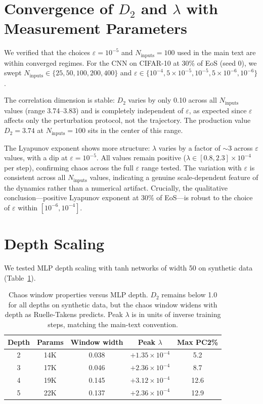 \documentclass[aps,prl,twocolumn,superscriptaddress,floatfix]{revtex4-2}
\begin{document}
\section{Convergence of $D_2$ and $\lambda$ with Measurement Parameters}

We verified that the choices $\varepsilon = 10^{-5}$ and $N_\text{inputs} = 100$ used in the main text are within converged regimes. For the CNN on CIFAR-10 at 30\% of EoS (seed 0), we swept $N_\text{inputs} \in \{25, 50, 100, 200, 400\}$ and $\varepsilon \in \{10^{-4}, 5{\times}10^{-5}, 10^{-5}, 5{\times}10^{-6}, 10^{-6}\}$.

The correlation dimension is stable: $D_2$ varies by only 0.10 across all $N_\text{inputs}$ values (range 3.74--3.83) and is completely independent of $\varepsilon$, as expected since $\varepsilon$ affects only the perturbation protocol, not the trajectory. The production value $D_2 = 3.74$ at $N_\text{inputs} = 100$ sits in the center of this range.

The Lyapunov exponent shows more structure: $\lambda$ varies by a factor of ${\sim}3$ across $\varepsilon$ values, with a dip at $\varepsilon = 10^{-5}$. All values remain positive ($\lambda \in [0.8, 2.3] \times 10^{-4}$ per step), confirming chaos across the full $\varepsilon$ range tested. The variation with $\varepsilon$ is consistent across all $N_\text{inputs}$ values, indicating a genuine scale-dependent feature of the dynamics rather than a numerical artifact. Crucially, the qualitative conclusion---positive Lyapunov exponent at 30\% of EoS---is robust to the choice of $\varepsilon$ within $[10^{-6}, 10^{-4}]$.

\section{Depth Scaling}

We tested MLP depth scaling with tanh networks of width 50 on synthetic data (Table~\ref{tab:depth}).

\begin{table}[h]
\caption{\label{tab:depth}%
Chaos window properties versus MLP depth. $D_2$ remains below 1.0 for all depths on synthetic data, but the chaos window widens with depth as Ruelle-Takens predicts. Peak $\lambda$ is in units of inverse training steps, matching the main-text convention.}
\begin{ruledtabular}
\begin{tabular}{ccccc}
Depth & Params & Window width & Peak $\lambda$ & Max PC2\%\\
\hline
2 & 14K & 0.038 & $+1.35 \times 10^{-4}$ & 5.2\\
3 & 17K & 0.046 & $+2.36 \times 10^{-4}$ & 8.7\\
4 & 19K & 0.145 & $+3.12 \times 10^{-4}$ & 12.6\\
5 & 22K & 0.137 & $+2.36 \times 10^{-4}$ & 12.9\\
\end{tabular}
\end{ruledtabular}
\end{table}
\end{document}
